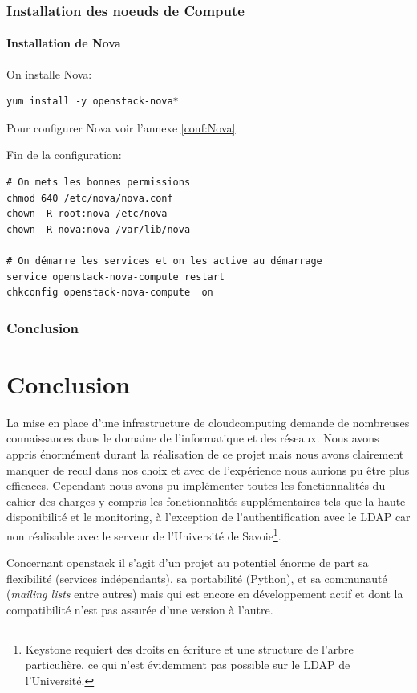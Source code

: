 \documentclass[a4paper,oneside]{report}
\begin{document}
\subsection{Installation des noeuds de Compute}
\subsubsection{Installation de Nova}
\noindent On installe Nova:
\begin{verbatim}
yum install -y openstack-nova*
\end{verbatim}

\noindent Pour configurer Nova voir l'annexe \ref{conf:Nova}.

\noindent Fin de la configuration:
\begin{verbatim}
# On mets les bonnes permissions
chmod 640 /etc/nova/nova.conf
chown -R root:nova /etc/nova
chown -R nova:nova /var/lib/nova

# On démarre les services et on les active au démarrage
service openstack-nova-compute restart
chkconfig openstack-nova-compute  on
\end{verbatim}

\subsection{Conclusion}


\chapter{Conclusion}
La mise en place d'une infrastructure de \gls{cloudcomputing} demande de nombreuses connaissances dans le domaine de l'informatique et des réseaux.
Nous avons appris énormément durant la réalisation de ce projet mais nous avons clairement manquer de recul dans nos choix et avec de l'expérience nous aurions pu être plus efficaces.\newline
Cependant nous avons pu implémenter toutes les fonctionnalités du cahier des charges y compris les fonctionnalités supplémentaires tels que la haute disponibilité et le monitoring, à l'exception de l'authentification avec le LDAP car non réalisable avec le serveur de l'Université de Savoie\footnote{Keystone requiert des droits en écriture et une structure de l'arbre particulière, ce qui n'est évidemment pas possible sur le LDAP de l'Université.}.

Concernant \gls{openstack} il s'agit d'un projet au potentiel énorme de part sa flexibilité (services indépendants), sa portabilité (Python), et sa communauté (\emph{mailing lists} entre autres) mais qui est encore en développement actif et dont la compatibilité n'est pas assurée d'une version à l'autre.
\end{document}
